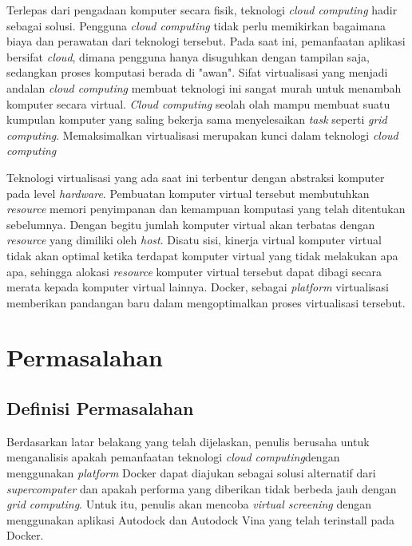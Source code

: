 Terlepas dari pengadaan komputer secara fisik, teknologi \textit{cloud computing} hadir sebagai solusi. Pengguna \textit{cloud computing} tidak perlu memikirkan bagaimana biaya dan perawatan dari teknologi tersebut. Pada saat ini, pemanfaatan aplikasi bersifat \textit{cloud}, dimana pengguna hanya disuguhkan dengan tampilan saja, sedangkan proses komputasi berada di "awan". Sifat virtualisasi yang menjadi andalan \textit{cloud computing} membuat teknologi ini sangat murah untuk menambah komputer secara virtual. \textit{Cloud computing} seolah olah mampu membuat suatu kumpulan komputer yang saling bekerja sama menyelesaikan \textit{task} seperti \textit{grid computing}. Memaksimalkan virtualisasi merupakan kunci dalam teknologi \textit{cloud computing}

Teknologi virtualisasi yang ada saat ini terbentur dengan abstraksi komputer pada level \textit{hardware}. Pembuatan komputer virtual tersebut membutuhkan \textit{resource} memori penyimpanan dan kemampuan komputasi yang telah ditentukan sebelumnya. Dengan begitu jumlah komputer virtual akan terbatas dengan \textit{resource} yang dimiliki oleh \textit{host}. Disatu sisi, kinerja virtual komputer virtual tidak akan optimal ketika terdapat komputer virtual yang tidak melakukan apa apa, sehingga alokasi \textit{resource} komputer virtual tersebut dapat dibagi secara merata kepada komputer virtual lainnya. Docker, sebagai \textit{platform} virtualisasi memberikan  pandangan baru dalam mengoptimalkan proses virtualisasi tersebut.  

\section{Permasalahan}
\subsection{Definisi Permasalahan}
\hspace{0.5cm}Berdasarkan latar belakang yang telah dijelaskan, penulis berusaha untuk menganalisis apakah pemanfaatan teknologi \textit{cloud computing}dengan menggunakan \textit{platform} Docker dapat diajukan sebagai solusi alternatif dari \textit{supercomputer} dan apakah performa yang diberikan tidak berbeda jauh dengan \textit{grid computing}. Untuk itu, penulis akan mencoba \textit{virtual screening} dengan menggunakan aplikasi Autodock dan Autodock Vina yang telah terinstall pada Docker.

